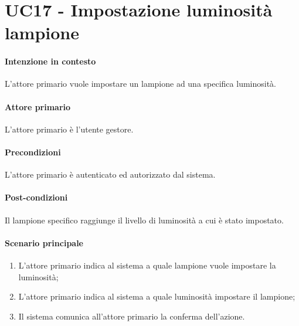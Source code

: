 \section{UC17 - Impostazione luminosità lampione}\label{uc:17}
\paragraph{Intenzione in contesto} L'attore primario vuole impostare un lampione ad una specifica luminosità.

\paragraph{Attore primario} L'attore primario è l'utente gestore.

\paragraph{Precondizioni}  L'attore primario è autenticato ed autorizzato dal sistema.

\paragraph{Post-condizioni} Il lampione specifico raggiunge il livello di luminosità a cui è stato impostato.
\paragraph{Scenario principale}
\begin{enumerate}
    \item L'attore primario indica al sistema a quale lampione vuole impostare la luminosità;
    \item L'attore primario indica al sistema a quale luminosità impostare il lampione;
    \item Il sistema comunica all'attore primario la conferma dell'azione.
\end{enumerate}